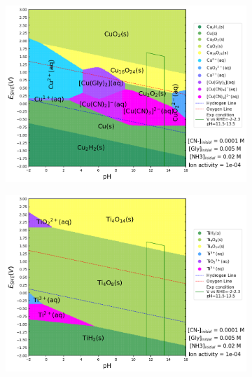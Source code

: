 \documentclass[journal=jacsat,manuscript=article]{achemso}
\begin{document}
\begin{figure}[htbp]
\begin{subfigure}[b]{0.3\textwidth}
        \par\medskip
    \end{subfigure}
    \begin{subfigure}[b]{0.3\textwidth}
        \subcaption{}\label{fig:Cu_Pourbaix_CN_CH3_Gly}
        \includegraphics[width=\textwidth]{Figures/pourbaix_diagrams/Cu-NH3-H2O_activity=1e-04_[NH3]=0.02M_[Gly]=0.005M_[CN]=0.0001.png}
        \par\medskip   
    \end{subfigure}
    \begin{subfigure}[b]{0.3\textwidth}
        \includegraphics[width=\textwidth]{Figures/pourbaix_diagrams/Ti-NH3-H2O_activity=1e-04_[NH3]=0.02M_[Gly]=0.005M_[CN]=0.0001.png}
        \subcaption{}\label{fig:Ti_Pourbaix_CN_CH3_Gly}

\end{subfigure}
\end{figure}
\end{document}
